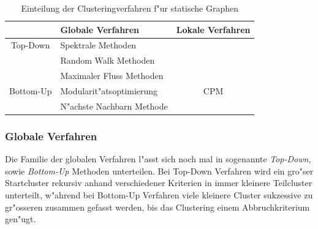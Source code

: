 \documentclass[journal]{vgtc}
\begin{document}
  
    \begin{table}[h]
    \caption{\label{tab:static_methods} Einteilung der Clusteringverfahren f"ur statische Graphen}
    \scriptsize
    \begin{center}
      \begin{tabular}{c|l|c}
	& Globale Verfahren & Lokale Verfahren\\
	\hline
	Top-Down  & Spektrale Methoden       & \\
	          & Random Walk Methoden     & \\
	          & Maximaler Fluss Methoden & \\
	\hline
	Bottom-Up & Modularit"atsoptimierung & CPM \\
	          & N"achste Nachbarn Methode & 
      \end{tabular}
    \end{center}
  \end{table}
  
  \subsubsection*{Globale Verfahren}
  Die Familie der globalen Verfahren l"asst sich noch mal in sogenannte \emph{Top-Down}, sowie
  \emph{Bottom-Up} Methoden \cite{Schaeffer} unterteilen. Bei Top-Down Verfahren wird ein gro"ser Startcluster rekursiv anhand
  verschiedener Kriterien in immer kleinere Teilcluster unterteilt, w"ahrend bei Bottom-Up Verfahren
  viele kleinere Cluster sukzessive zu gr"osseren zusammen gefasst werden, bis das Clustering einem
  Abbruchkriterium gen"ugt.
  
\end{document}

